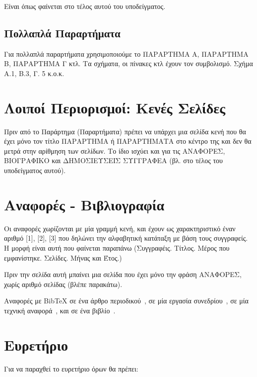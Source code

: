Είναι όπως φαίνεται στο τέλος αυτού του υποδείγματος.

\subsection{Πολλαπλά Παραρτήματα}
\label{subsec:MultipleAppendices}

Για πολλαπλά παραρτήματα χρησιμοποιούμε το ΠΑΡΑΡΤΗΜΑ Α, ΠΑΡΑΡΤΗΜΑ
Β, ΠΑΡΑΡΤΗΜΑ Γ κτλ. Τα σχήματα, οι πίνακες κτλ έχουν τον
συμβολισμό. Σχήμα Α.1, Β.3, Γ. 5 κ.ο.κ.



\section{Λοιποί Περιορισμοί: Κενές Σελίδες}
\label{sec:Restrictions}

Πριν από το Παράρτημα (Παραρτήματα) πρέπει να υπάρχει μια σελίδα
κενή που θα έχει μόνο τον τίτλο ΠΑΡΑΡΤΗΜΑ ή ΠΑΡΑΡΤΗΜΑΤΑ στο κέντρο
της και δεν θα μετρά στην αρίθμηση των σελίδων.  Το ίδιο ισχύει
και για τις ΑΝΑΦΟΡΕΣ, ΒΙΟΓΡΑΦΙΚΟ και ΔΗΜΟΣΙΕΥΣΕΙΣ ΣΥΓΓΡΑΦΕΑ (βλ.
στο τέλος του υποδείγματος αυτού).


\section{Αναφορές - Βιβλιογραφία}
\label{sec:Bibliography}

Οι αναφορές χωρίζονται με μία γραμμή κενή, και έχουν ως
χαρακτηριστικό έναν αριθμό [1], [2], [3] που δηλώνει την
αλφαβητική κατάταξη με βάση τους συγγραφείς. Η μορφή είναι αυτή
που φαίνεται παραπάνω (Συγγραφέις. Τίτλος. Μέρος που εμφανίστηκε.
Σελίδες. Μήνας και Έτος.)

Πριν την σελίδα αυτή μπαίνει μια σελίδα που έχει μόνο την φράση
ΑΝΑΦΟΡΕΣ, χωρίς αριθμό σελίδας (βλέπε παρακάτω).

Αναφορές με BibTeX σε ένα άρθρο περιοδικού~\cite{Newman2003a}, σε μία εργασία συνεδρίου~\cite{DeCandia2007a}, σε μία τεχνική αναφορά~\cite{Jain1984a}, και σε ένα βιβλίο~\cite{Golumbic2004a}.


\section{Ευρετήριο}
\label{sec:Index}

Για να παραχθεί το ευρετήριο όρων θα πρέπει:


